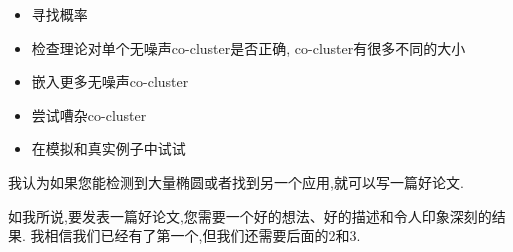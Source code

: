 \documentclass[12pt]{ctexart}
\begin{document}
\begin{itemize}
\begin{itemize}
              \item 寻找概率
              \item 检查理论对单个无噪声co-cluster是否正确, co-cluster有很多不同的大小
              \item 嵌入更多无噪声co-cluster
              \item 尝试嘈杂co-cluster
              \item 在模拟和真实例子中试试
          \end{itemize}
\end{itemize}

我认为如果您能检测到大量椭圆或者找到另一个应用,就可以写一篇好论文. 

如我所说,要发表一篇好论文,您需要一个好的想法、好的描述和令人印象深刻的结果. 我相信我们已经有了第一个,但我们还需要后面的$\mathrm{2}$和$\mathrm{3}$. 
\end{document}
